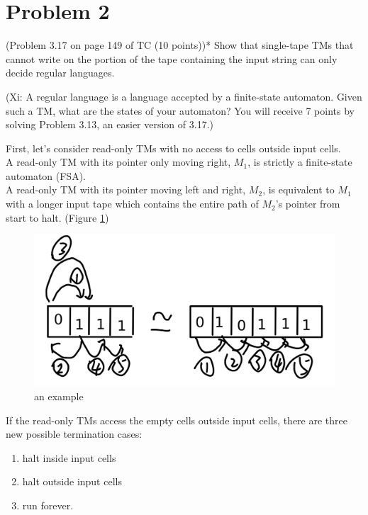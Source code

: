 \documentclass[twoside,11pt]{homework}
\begin{document}
\section*{Problem 2}

(Problem 3.17 on page 149 of TC (10 points))*
Show that single-tape TMs that cannot write on the portion of the tape
containing the input string can only decide regular languages.

(Xi: A regular language is a language accepted by a finite-state automaton.
Given such a TM, what are the states of your automaton?
You will receive 7 points by solving Problem 3.13, an easier version of 3.17.)

\begin{solution}
  First, let's consider read-only TMs with no access to cells outside input cells.\\
  A read-only TM with its pointer only moving right, $M_1$, is strictly a
  finite-state automaton (FSA).\\
  A read-only TM with its pointer moving left and right, $M_2$, is equivalent to
  $M_1$ with a longer input tape which contains the entire path of $M_2$'s
  pointer from start to halt. (Figure \ref{fig:01})

  \begin{figure}[h]
  	\centering
  	\includegraphics[width=0.7\linewidth]{img/01.png}
  	\caption{an example}
  	\label{fig:01}
  \end{figure}

  If the read-only TMs access the empty cells outside input cells,
  there are three new possible termination cases:
  \begin{enumerate}
  \item halt inside input cells
  \item halt outside input cells
  \item run forever.
  \end{enumerate}


\end{solution}
\end{document}
